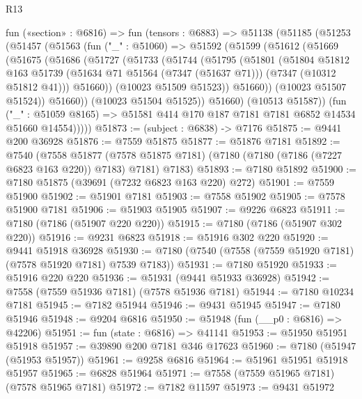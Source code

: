 \begin{lexlean}{R13}
\begin{coremodule}
  fun («section» : @6816) =>
  fun (tensors : @6883) =>
  @51138
    (@51185
      (@51253
        (@51457
          (@51563
            (fun ("_" : @51060) =>
            @51592
              (@51599
                (@51612
                  (@51669
                    (@51675
                      (@51686
                        (@51727
                          (@51733
                            (@51744
                              (@51795
                                (@51801
                                  (@51804
                                    @51812
                                    @163
                                    @51739
                                    (@51634 @71 @51564 (@7347 (@51637 @71)))
                                    (@7347 (@10312 @51812 @41)))
                                  @51660))
                              (@10023 @51509 @51523))
                            @51660))
                        (@10023 @51507 @51524))
                      @51660))
                  (@10023 @51504 @51525))
                @51660)
              (@10513 @51587))
            (fun ("_" : @51059 @8165) =>
            @51581 @414 @170 @187 @7181 @7181 @6852 @14534 @51660 @14554)))))
@51873 := (subject : @6838) -> @7176
@51875 := @9441 @200 @36928
@51876 := @7559 @51875
@51877 := @51876 @7181
@51892 := @7540
    (@7558
      @51877
      (@7578 @51875 @7181)
      (@7180 (@7180 (@7186 (@7227 @6823 @163 @220)) @7183) @7181)
      @7183)
@51893 := @7180 @51892
@51900 := @7180 @51875 (@39691 (@7232 @6823 @163 @220) @272)
@51901 := @7559 @51900
@51902 := @51901 @7181
@51903 := @7558 @51902
@51905 := @7578 @51900 @7181
@51906 := @51903 @51905
@51907 := @9226 @6823
@51911 := @7180 (@7186 (@51907 @220 @220))
@51915 := @7180 (@7186 (@51907 @302 @220))
@51916 := @9231 @6823
@51918 := @51916 @302 @220
@51920 := @9441 @51918 @36928
@51930 := @7180 (@7540 (@7558 (@7559 @51920 @7181) (@7578 @51920 @7181) @7539 @7183))
@51931 := @7180 @51920
@51933 := @51916 @220 @220
@51936 := @51931 (@9441 @51933 @36928)
@51942 := @7558 (@7559 @51936 @7181) (@7578 @51936 @7181)
@51944 := @7180 @10234 @7181
@51945 := @7182 @51944
@51946 := @9431 @51945
@51947 := @7180 @51946
@51948 := @9204 @6816
@51950 := @51948 (fun (__p0 : @6816) => @42206)
@51951 := fun (state : @6816) => @41141
@51953 := @51950 @51951 @51918
@51957 := @39890 @200 @7181 @346 @17623
@51960 := @7180 (@51947 (@51953 @51957))
@51961 := @9258 @6816
@51964 := @51961 @51951 @51918 @51957
@51965 := @6828 @51964
@51971 := @7558 (@7559 @51965 @7181) (@7578 @51965 @7181)
@51972 := @7182 @11597
@51973 := @9431 @51972

\end{coremodule}
\end{lexlean}
